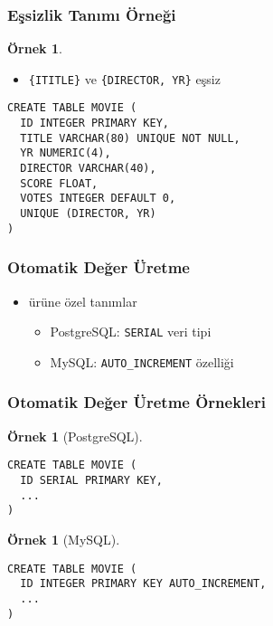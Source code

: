 \documentclass[dvipsnames]{beamer}
\theoremstyle{definition}
\theoremstyle{example}
\newtheorem{ornek}[theorem]{Örnek}
\theoremstyle{plain}
\begin{document}
\begin{frame}[fragile]
  \frametitle{Eşsizlik Tanımı Örneği}

  \begin{ornek}
    \begin{itemize}
      \item \texttt{\{ITITLE\}} ve \texttt{\{DIRECTOR, YR\}} eşsiz
    \end{itemize}

    \begin{lstlisting}
CREATE TABLE MOVIE (
  ID INTEGER PRIMARY KEY,
  TITLE VARCHAR(80) UNIQUE NOT NULL,
  YR NUMERIC(4),
  DIRECTOR VARCHAR(40),
  SCORE FLOAT,
  VOTES INTEGER DEFAULT 0,
  UNIQUE (DIRECTOR, YR)
)
    \end{lstlisting}
  \end{ornek}
\end{frame}

\begin{frame}[fragile]
  \frametitle{Otomatik Değer Üretme}

  \begin{itemize}
    \item ürüne özel tanımlar
    \begin{itemize}
      \item PostgreSQL: \texttt{SERIAL} veri tipi
      \item MySQL: \texttt{AUTO\_INCREMENT} özelliği
    \end{itemize}
  \end{itemize}
\end{frame}

\begin{frame}[fragile]
  \frametitle{Otomatik Değer Üretme Örnekleri}

  \begin{ornek}[PostgreSQL]
    \begin{lstlisting}
CREATE TABLE MOVIE (
  ID SERIAL PRIMARY KEY,
  ...
)
    \end{lstlisting}
  \end{ornek}

  \pause
  \begin{ornek}[MySQL]
    \begin{lstlisting}
CREATE TABLE MOVIE (
  ID INTEGER PRIMARY KEY AUTO_INCREMENT,
  ...
)
    \end{lstlisting}
  \end{ornek}
\end{frame}
\end{document}
